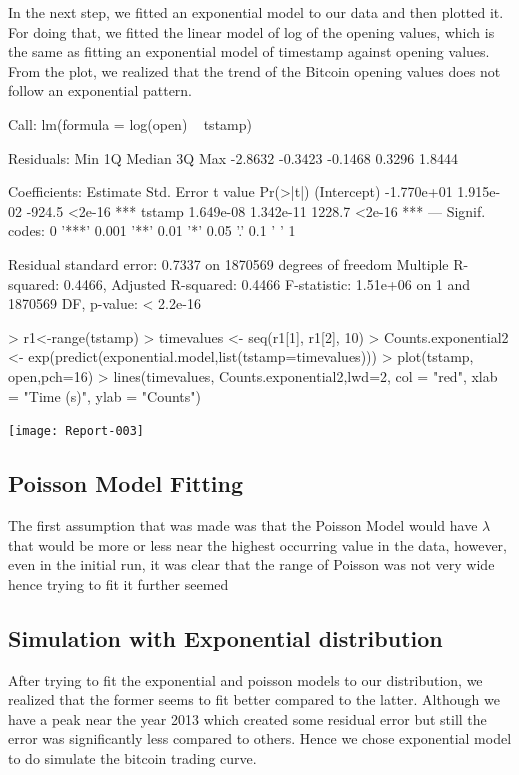 \documentclass{article}
\begin{document}
In the next step, we fitted an exponential model to our data and then plotted it. For doing that, we fitted the linear model of log of the opening values, which is the same as fitting an exponential model of timestamp against opening values. From the plot, we realized that the trend of the Bitcoin opening values does not follow an exponential pattern.
\begin{Schunk}
\begin{Soutput}
Call:
lm(formula = log(open) ~ tstamp)

Residuals:
    Min      1Q  Median      3Q     Max 
-2.8632 -0.3423 -0.1468  0.3296  1.8444 

Coefficients:
              Estimate Std. Error t value Pr(>|t|)    
(Intercept) -1.770e+01  1.915e-02  -924.5   <2e-16 ***
tstamp       1.649e-08  1.342e-11  1228.7   <2e-16 ***
---
Signif. codes:  0 '***' 0.001 '**' 0.01 '*' 0.05 '.' 0.1 ' ' 1

Residual standard error: 0.7337 on 1870569 degrees of freedom
Multiple R-squared:  0.4466,	Adjusted R-squared:  0.4466 
F-statistic: 1.51e+06 on 1 and 1870569 DF,  p-value: < 2.2e-16
\end{Soutput}
\begin{Sinput}
> r1<-range(tstamp)
> timevalues <- seq(r1[1], r1[2], 10)
> Counts.exponential2 <- exp(predict(exponential.model,list(tstamp=timevalues)))
> plot(tstamp, open,pch=16)
> lines(timevalues, Counts.exponential2,lwd=2, col = "red", xlab = "Time (s)", ylab = "Counts")
\end{Sinput}
\end{Schunk}
\texttt{[image: Report-003]}
	
\subsection{Poisson Model Fitting}
The first assumption that was made was that the Poisson Model would have $\lambda$ that would be more or less near the highest occurring value in the data, however, even in the initial run, it was clear that the range of Poisson was not very wide hence trying to fit it further seemed 

\subsection{Simulation with Exponential distribution}
After trying to fit the exponential and poisson models to our distribution, we realized that the former seems to fit better compared to the latter. Although we have a peak near the year 2013 which created some residual error but still the error was significantly less compared to others. Hence we chose exponential model to do simulate the bitcoin trading curve.
\end{document}

